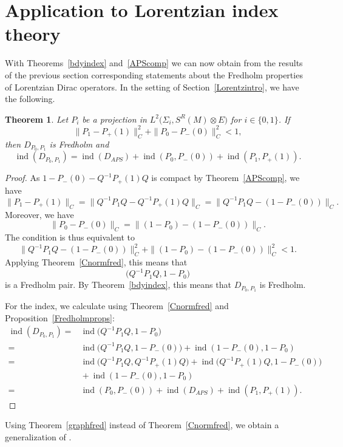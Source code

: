 \documentclass[pdftex]{sigma}
\numberwithin{equation}{section}
\newtheorem{Theorem}{Theorem}[section]
\DeclareMathOperator{\ind}{ind}
\begin{document}
	\section{Application to Lorentzian index theory}
	\label{s4}
	With Theorems~\ref{bdyindex} and~\ref{APScomp} we can now obtain from the results of the previous section corresponding statements about the Fredholm properties of Lorentzian Dirac operators. In the setting of Section~\ref{Lorentzintro}, we have the following.

	\begin{Theorem}
		\label{finalCnorm}
		Let $P_i$ be a projection in $L^2\bigl(\Sigma_i,S^R(M)\otimes E\bigr)$ for $i\in \{0,1\}$.
		If
		\[\|P_1-P_+(1)\|_C^2+\|P_0-P_-(0)\|_C^2<1,\]
		then $D_{P_0,P_1}$ is Fredholm  and
		\[\ind(D_{P_0,P_1})=\ind(D_{APS})+\ind(P_0,P_-(0))+\ind(P_1,P_+(1)).\]
	\end{Theorem}
	\begin{proof}
		As $1-P_-(0)-Q^{-1}P_+(1)Q$ is compact by Theorem~\ref{APScomp}, we have
		\[\|P_1-P_+(1)\|_C=\bigl\|Q^{-1}P_1Q-Q^{-1}P_+(1)Q\bigr\|_C=\bigl\|Q^{-1}P_1Q-(1-P_-(0))\bigr\|_C.\]
		Moreover, we have
		\[\|P_0-P_-(0)\|_C=\|(1-P_0)-(1-P_-(0))\|_C.\]
		The condition is thus equivalent to
		\[\bigl\|Q^{-1}P_1Q-(1-P_-(0))\bigr\|_C^2+\|(1-P_0)-(1-P_-(0))\|_C^2<1.\]
		Applying Theorem~\ref{Cnormfred}, this means that
		\[\bigl(Q^{-1}P_1Q,1-P_0\bigr)\]
		is a Fredholm pair. By Theorem~\ref{bdyindex}, this means that
		$D_{P_0,P_1}$ is Fredholm.

		For the index, we calculate using Theorem~\ref{Cnormfred} and Proposition~\ref{Fredholmprops}:
		\begin{align*}
			\ind(D_{P_0,P_1})={}&\ind\bigl(Q^{-1}P_1Q,1-P_0\bigr)\\
={}&\ind\bigl(Q^{-1}P_1Q,1-P_-(0)\bigr)+\ind(1-P_-(0),1-P_0)\\
={}&\ind\bigl(Q^{-1}P_1Q,Q^{-1}P_+(1)Q\bigr)+\ind\bigl(Q^{-1}P_+(1)Q,1-P_-(0)\bigr)\\
			&{} +\ind(1-P_-(0),1-P_0) \\
={}&\ind(P_0,P_-(0))+\ind(D_{APS})+\ind(P_1,P_+(1)).
\tag*{\qed}
\end{align*}
\renewcommand{\qed}{}
\end{proof}

Using Theorem~\ref{graphfred} instead of Theorem~\ref{Cnormfred}, we obtain a generalization of \cite[Proposition~4.5]{BH}.
\end{document}
